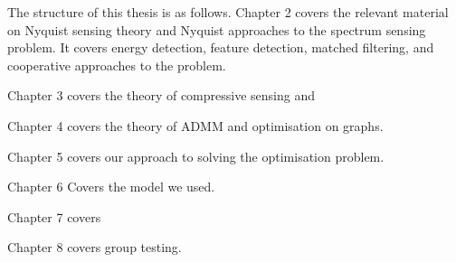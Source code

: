 The structure of this thesis is as follows. Chapter 2 covers the relevant material on Nyquist sensing theory and Nyquist approaches to the spectrum sensing problem. It covers energy detection, feature detection, matched filtering, and cooperative approaches to the problem.

Chapter 3 covers the theory of compressive sensing and 

Chapter 4 covers the theory of ADMM and optimisation on graphs.

Chapter 5 covers our approach to solving the optimisation problem.

Chapter 6 Covers the model we used.

Chapter 7 covers

Chapter 8 covers group testing.
